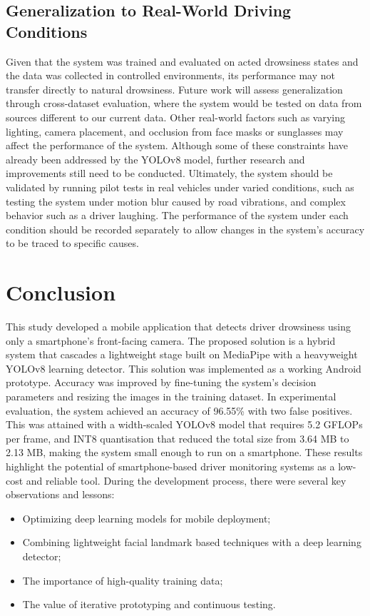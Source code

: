 \documentclass[pdflatex,sn-mathphys-num]{sn-jnl}
\theoremstyle{thmstyleone}%
\theoremstyle{thmstyletwo}%
\theoremstyle{thmstylethree}%
\begin{document}
	\subsection{Generalization to Real-World Driving Conditions}\label{subsec6.3}
	Given that the system was trained and evaluated on acted drowsiness states and the data was collected in controlled environments, its performance may not transfer directly to natural drowsiness.  Future work will assess generalization through cross-dataset evaluation, where the system would be tested on data from sources different to our current data. 
	Other real-world factors such as varying lighting, camera placement, and occlusion from face masks or sunglasses may affect the performance of the system. Although some of these constraints have already been addressed by the YOLOv8 model, further research and improvements still need to be conducted.
	Ultimately, the system should be validated by running pilot tests in real vehicles under varied conditions, such as testing the system under motion blur caused by road vibrations, and complex behavior such as a driver laughing. The performance of the system under each condition should be recorded separately to allow changes in the system’s accuracy to be traced to specific causes. 
	
	\section{Conclusion}\label{sec:conclusion}
	This study developed a mobile application that detects driver drowsiness using only a smartphone’s front-facing camera. The proposed solution is a hybrid system that cascades a lightweight stage built on MediaPipe with a heavyweight YOLOv8 learning detector. This solution was implemented as a working Android prototype. Accuracy was improved by fine-tuning the system’s decision parameters and resizing the images in the training dataset.
	In experimental evaluation, the system achieved an accuracy of 96.55\% with two false positives. This was attained with a width-scaled YOLOv8 model that requires 5.2 GFLOPs per frame, and INT8 quantisation that reduced the total size from 3.64 MB to 2.13 MB, making the system small enough to run on a smartphone. These results highlight the potential of smartphone-based driver monitoring systems as a low-cost and reliable tool.
	During the development process, there were several key observations and lessons:
	\begin{itemize}
		\item Optimizing deep learning models for mobile deployment;
		\item Combining lightweight facial landmark based techniques with a deep learning detector;
		\item The importance of high-quality training data;
		\item The value of iterative prototyping and continuous testing.
	\end{itemize}
	
\end{document}
